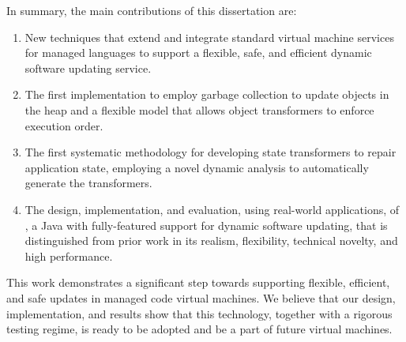 In summary, the main contributions of this dissertation are:
\begin{enumerate}
\item New techniques that extend and integrate standard virtual machine services
for managed languages to support a flexible, safe, and efficient dynamic
software updating service.
\item The first implementation to employ garbage collection to update objects in the heap and a
flexible model that allows object transformers to enforce execution order.
\item The first systematic methodology for developing state transformers to
repair application state, employing a novel
dynamic analysis to automatically generate the transformers.
\item The design, implementation, and evaluation, using real-world
applications, of \JV, a Java \VM with
fully-featured support for dynamic software updating, that is distinguished
from prior work in its realism, flexibility, technical novelty, and high
performance.  
\end{enumerate}
This work demonstrates a significant step towards supporting flexible,
efficient, and safe updates in managed code virtual machines.  We believe
that our design, implementation, and results show that this technology,
together with a rigorous testing regime, is ready to be adopted and be a
part of future virtual machines.

